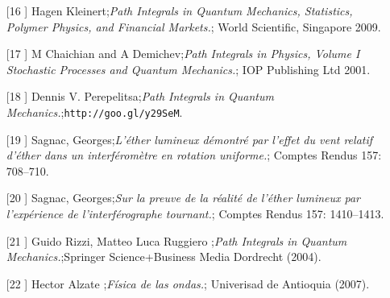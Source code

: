 \begin{itemize}
\item[[16]]  Hagen Kleinert;\textit{Path Integrals in Quantum Mechanics, Statistics, Polymer Physics, and Financial Markets.};  World Scientific, Singapore 2009.
\item[[17]]  M Chaichian and A Demichev;\textit{Path Integrals in Physics, Volume I
Stochastic Processes and Quantum Mechanics.};  IOP Publishing Ltd 2001.
\item[[18]] Dennis V. Perepelitsa;\textit{Path Integrals in Quantum Mechanics.};\texttt{http://goo.gl/y29SeM}.
\item[[19]] Sagnac, Georges;\textit{L'éther lumineux démontré par l'effet du vent relatif d'éther dans un interféromètre en rotation uniforme.}; Comptes Rendus 157: 708–710.
\item[[20]] Sagnac, Georges;\textit{Sur la preuve de la réalité de l'éther lumineux par l'expérience de l'interférographe tournant.};  Comptes Rendus 157: 1410–1413.
\item[[21]] Guido Rizzi, Matteo Luca Ruggiero ;\textit{Path Integrals in Quantum Mechanics.};Springer Science+Business Media Dordrecht (2004).
\item[[22]] Hector Alzate ;\textit{Física de las ondas.}; Univerisad de Antioquia (2007).
\end{itemize}

